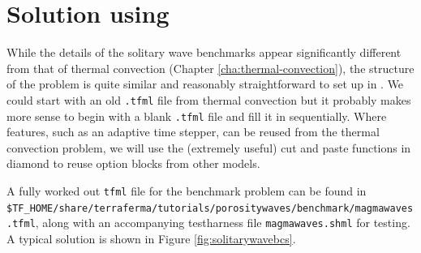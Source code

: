 \section{Solution using \TF}

While the details of the solitary wave benchmarks appear significantly
different from that of thermal convection (Chapter
\ref{cha:thermal-convection}), the structure of the problem is quite
similar and reasonably straightforward to set up in \TF{}.  We could
start with an old \texttt{.tfml} file from thermal convection but it
probably makes more sense to begin with a blank \texttt{.tfml} file
and fill it in sequentially.  Where features, such as an adaptive time
stepper, can be reused from the thermal convection problem, we will
use the (extremely useful) cut and paste functions in diamond to reuse
option blocks from other models.

A fully worked out \texttt{tfml} file for the benchmark problem 
can be found in
\texttt{\$TF\_HOME/share/terraferma/tutorials/porositywaves/benchmark/magmawaves.tfml},
along with an accompanying testharness file \texttt{magmawaves.shml}
for testing.  A typical solution is shown in Figure \ref{fig:solitarywavebcs}.

